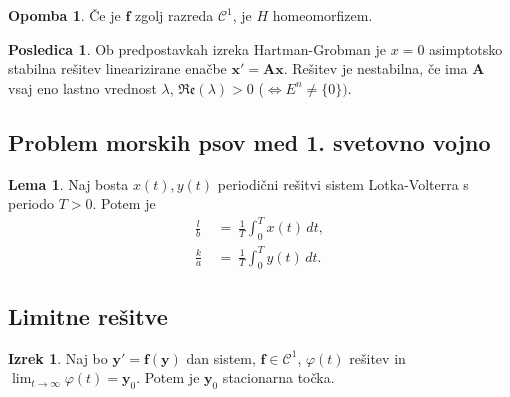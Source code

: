 \documentclass[11pt]{article}
\newcommand{\f}{\mathbf{f}}
\newcommand{\x}{\mathbf{x}}
\newcommand{\y}{\mathbf{y}}
\newcommand{\A}{\mathbf{A}}
\newcommand{\C}{\mathcal{C}}
\newcommand{\set}[1]{\{#1\}}
\newcommand{\re}{\mathfrak{Re}}
\newcommand{\0}{\mathbf{0}}
\theoremstyle{definition}
\theoremstyle{definition}
\theoremstyle{definition}
\newtheorem{izrek}{Izrek}[section]
\theoremstyle{definition}
\newtheorem*{posledica}{Posledica}
\newtheorem*{opomba}{Opomba}
\newtheorem{lema}{Lema}
\begin{document}
\begin{opomba}

Če je $\f$ zgolj razreda $\C^1$, je $H$ homeomorfizem.

\end{opomba}
\vspace{0.5cm}

\begin{posledica}

Ob predpostavkah izreka Hartman-Grobman je $x=0$ asimptotsko stabilna rešitev linearizirane enačbe $\x' = \A\x$. Rešitev je nestabilna, če ima $\A$ vsaj eno lastno vrednost $\lambda$, $\re(\lambda)>0$ ($\iff E^n \neq \set{0})$.

\end{posledica}
\vspace{0.5cm}


\subsection{Problem morskih psov med 1. svetovno vojno}
\vspace{0.5cm}

\begin{lema}

Naj bosta $x(t),y(t)$ periodični rešitvi sistem Lotka-Volterra s periodo $T>0$. Potem je
\begin{align*}
\frac{l}{b} ~&=~ \frac{1}{T}\int_0^T x(t)\,dt, \\
\frac{k}{a} ~&=~ \frac{1}{T}\int_0^T y(t)\,dt.
\end{align*}

\end{lema}
\vspace{0.5cm}


\subsection{Limitne rešitve}
\vspace{0.5cm}

\begin{izrek}

Naj bo $\y' = \f(\y)$ dan sistem, $\f\in\C^1$, $\varphi(t)$ rešitev in \hbox{$\lim_{t \rightarrow \infty} \varphi(t) = \y_0$}. Potem je $\y_0$ stacionarna točka.

\end{izrek}
\vspace{0.5cm}


\pagebreak

\end{document}
